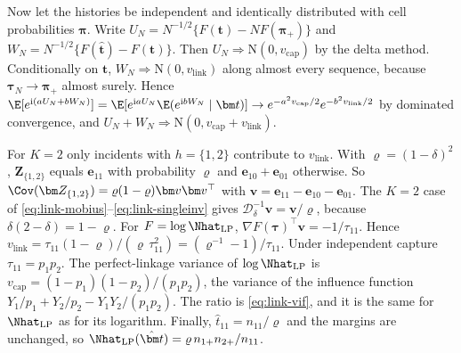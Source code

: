 Now let the histories be independent and identically distributed with cell probabilities $\bm\pi$. Write $U_N=N^{-1/2}\{F(\bm t)-NF(\bm\pi_+)\}$ and $W_N=N^{-1/2}\{F(\hat{\bm t})-F(\bm t)\}$. Then $U_N\Rightarrow\mathrm N(0,v_{\mathrm{cap}})$ by the delta method. Conditionally on $\bm t$, $W_N\Rightarrow\mathrm N(0,v_{\mathrm{link}})$ along almost every sequence, because $\bm\tau_N\to\bm\pi_+$ almost surely. Hence $\E[e^{\mathrm i(aU_N+bW_N)}]=\E[e^{\mathrm iaU_N}\E(e^{\mathrm ibW_N}\mid\bm t)]\to e^{-a^2v_{\mathrm{cap}}/2}e^{-b^2v_{\mathrm{link}}/2}$ by dominated convergence, and $U_N+W_N\Rightarrow\mathrm N(0,v_{\mathrm{cap}}+v_{\mathrm{link}})$.

For $K=2$ only incidents with $h=\{1,2\}$ contribute to $v_{\mathrm{link}}$. With $\varrho=(1-\delta)^2$, $\bm Z_{\{1,2\}}$ equals $\bm e_{11}$ with probability $\varrho$ and $\bm e_{10}+\bm e_{01}$ otherwise. So $\Cov(\bm Z_{\{1,2\}})=\varrho(1-\varrho)\bm v\bm v^{\top}$ with $\bm v=\bm e_{11}-\bm e_{10}-\bm e_{01}$. The $K=2$ case of \eqref{eq:link-mobius}--\eqref{eq:link-singleinv} gives $\mathcal D_\delta^{-1}\bm v=\bm v/\varrho$, because $\delta(2-\delta)=1-\varrho$. For $F=\log\Nhat_{\mathrm{LP}}$, $\nabla F(\bm\tau)^{\top}\bm v=-1/\tau_{11}$. Hence $v_{\mathrm{link}}=\tau_{11}(1-\varrho)/(\varrho\,\tau_{11}^2)=(\varrho^{-1}-1)/\tau_{11}$. Under independent capture $\tau_{11}=p_1p_2$. The perfect-linkage variance of $\log\Nhat_{\mathrm{LP}}$ is $v_{\mathrm{cap}}=(1-p_1)(1-p_2)/(p_1p_2)$, the variance of the influence function $Y_1/p_1+Y_2/p_2-Y_1Y_2/(p_1p_2)$. The ratio is \eqref{eq:link-vif}, and it is the same for $\Nhat_{\mathrm{LP}}$ as for its logarithm. Finally, $\hat t_{11}=n_{11}/\varrho$ and the margins are unchanged, so $\Nhat_{\mathrm{LP}}(\hat{\bm t})=\varrho\,n_{1+}n_{2+}/n_{11}$.

